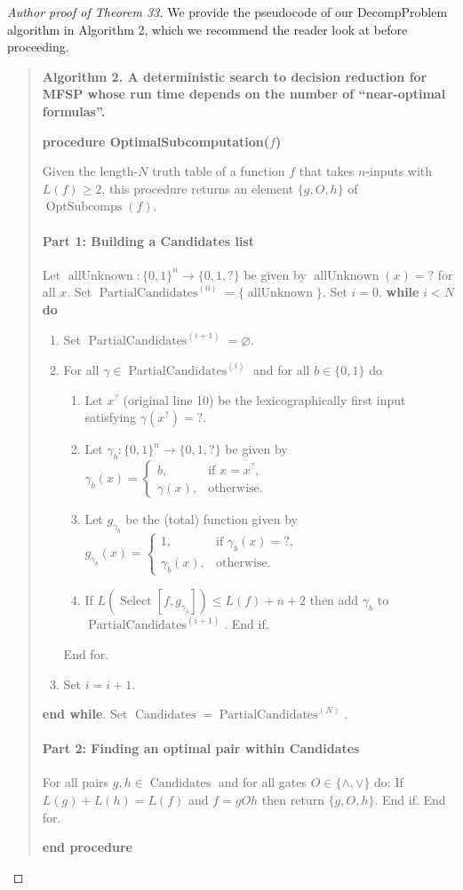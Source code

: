 \documentclass[10pt,a4paper]{article}
\newcommand{\Opt}{\operatorname{OptSubcomps}}
\newcommand{\Select}{\operatorname{Select}}
\newcommand{\PC}[1]{\operatorname{PartialCandidates}^{(#1)}}
\newcommand{\Candidates}{\operatorname{Candidates}}
\begin{document}
\begin{proof}[Author proof of Theorem 33]
We provide the pseudocode of our DecompProblem algorithm in Algorithm 2, which we recommend the reader look at before proceeding.
\begin{quote}\textbf{Algorithm 2. A deterministic search to decision reduction for MFSP whose run time depends on the number of ``near-optimal formulas''.}\par
\textbf{procedure OptimalSubcomputation($f$)}\par
Given the length-$N$ truth table of a function $f$ that takes $n$-inputs with $L(f)\geq 2$, this procedure returns an element $\{g,O,h\}$ of $\Opt(f)$.
\paragraph{Part 1: Building a Candidates list}
Let $\operatorname{allUnknown}:\{0,1\}^n\to\{0,1,?\}$ be given by $\operatorname{allUnknown}(x)=?$ for all $x$. Set $\PC{0}=\{\operatorname{allUnknown}\}$. Set $i=0$.
\textbf{while} $i<N$ \textbf{do}
\begin{enumerate}
\item Set $\PC{i+1}=\varnothing$.
\item For all $\gamma\in\PC{i}$ and for all $b\in\{0,1\}$ do
\begin{enumerate}
\item Let $x^?$ (original line 10) be the lexicographically first input satisfying $\gamma(x^?)=?$.
\item Let $\gamma_b:\{0,1\}^n\to\{0,1,?\}$ be given by $\gamma_b(x)=\begin{cases}b,&\text{if }x=x^?,\\\gamma(x),&\text{otherwise}.\end{cases}$
\item Let $g_{\gamma_b}$ be the (total) function given by $g_{\gamma_b}(x)=\begin{cases}1,&\text{if }\gamma_b(x)=?,\\\gamma_b(x),&\text{otherwise}.\end{cases}$
\item If $L(\Select[f,g_{\gamma_b}])\leq L(f)+n+2$ then add $\gamma_b$ to $\PC{i+1}$. End if.
\end{enumerate}
End for.
\item Set $i=i+1$.
\end{enumerate}
\textbf{end while}. Set $\Candidates=\PC{N}$.
\paragraph{Part 2: Finding an optimal pair within Candidates}
For all pairs $g,h\in\Candidates$ and for all gates $O\in\{\land,\lor\}$ do: If $L(g)+L(h)=L(f)$ and $f=gOh$ then return $\{g,O,h\}$. End if. End for.\par
\textbf{end procedure}
\end{quote}

\end{proof}
\end{document}
